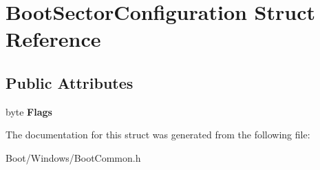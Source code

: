 \hypertarget{struct_boot_sector_configuration}{}\section{Boot\+Sector\+Configuration Struct Reference}
\label{struct_boot_sector_configuration}
\subsection*{Public Attributes}
\begin{DoxyCompactItemize}
\item 
\mbox{\label{struct_boot_sector_configuration_a054412a7f8dd171ebe010a15a0e3323e}} 
byte {\bfseries Flags}
\end{DoxyCompactItemize}


The documentation for this struct was generated from the following file\+:\begin{DoxyCompactItemize}
\item 
Boot/\+Windows/Boot\+Common.\+h\end{DoxyCompactItemize}
